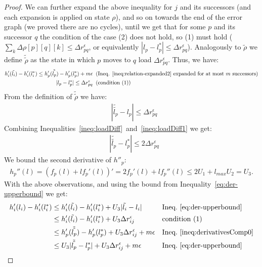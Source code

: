 \documentclass[11pt]{article}
\newcommand{\lmax}{{{l_{\mathit{max}}}}}
\begin{document}
\begin{proof}
We can further expand the above inequality for $j$ and its successors (and each expansion is applied on state $\rho$), and so on towards the end of the error graph (we proved there are no cycles), until we get that for some $p$ and its successor $q$ the condition of the case (2) does not hold, so (1) must hold ($\sum_k \Delta \rho[p][q][k] \leq \Delta r^{\epsilon}_{pq}$, or equivalently $|l_{p} - l^{*}_{p}| \leq \Delta r^{\epsilon}_{p q}$). 
Analogously to $\tilde{\rho}$ we define $\tilde{\tilde{\rho}}$ as the state in which $p$ moves to $q$ load $\Delta r^{\epsilon}_{pq}$.
Thus, we have:
\begin{align}
 h'_i(\tilde{l_{i}}) - h'_i(l^{*}_{i}) \leq h'_p(\tilde{\tilde{l_{p}}}) - h'_p(l^{*}_{p}) + m\epsilon & \; \; \text{(Ineq. \ref{ineq:relation-expanded2} expanded for at most $m$ successors)} \label{ineq:derivativesComp0} \\
|l_{p} - l^{*}_{p}| \leq \Delta r^{\epsilon}_{pq} & \; \; \text{(condition (1))}\label{ineq:loadDiff}
\end{align}
From the definition of $\tilde{\tilde{\rho}}$ we have:
\begin{align}
& |\tilde{\tilde{l_{p}}} - l_{p}| \leq \Delta r^{\epsilon}_{pq} \label{ineq:loadDiff1}
\end{align}
Combining Inequalities~\ref{ineq:loadDiff}~and~\ref{ineq:loadDiff1} we get:
\begin{align}
& |\tilde{\tilde{l_{p}}} - l^{*}_{p}| \leq 2\Delta r^{\epsilon}_{pq} \label{ineq:loadDiff2}
\end{align}
We bound the second derivative of $h''_p$:
\begin{align}
h_{p}''(l) = (f_p(l) + l f_p'(l))' = 2f_p'(l) + l f_p''(l) \leq 2U_1 + \lmax U_2 = U_3 \label{ineq:loadDiff3}\textrm{.}
\end{align}
With the above observations, and using the bound from Inequality~\ref{eq:der-upperbound} we get: 
\begin{align*}
h_i'(l_{i}) - h_i'(l^{*}_{i})  & \leq h_i'(\tilde{l_{i}}) - h_i'(l^{*}_{i}) + U_3 |\tilde{l_{i}} - l_{i}| && \text{Ineq.~\ref{eq:der-upperbound}} \\
                             & \leq h_i'(\tilde{l_{i}}) - h_i'(l^{*}_{i}) + U_3 \Delta r^{\epsilon}_{ij} && \text{condition (1)} \\
                             & \leq h_p'(\tilde{\tilde{l_{p}}}) - h_p'(l^{*}_{p}) + U_3 \Delta r^{\epsilon}_{ij}  + m\epsilon && \text{Ineq.~\ref{ineq:derivativesComp0}}\\
                             & \leq U_3 |\tilde{\tilde{l_{p}}} - l^{*}_{p}| + U_3 \Delta r^{\epsilon}_{ij}  + m\epsilon && \text{Ineq.~\ref{eq:der-upperbound}} \\

\end{align*}
\end{proof}
\end{document}
